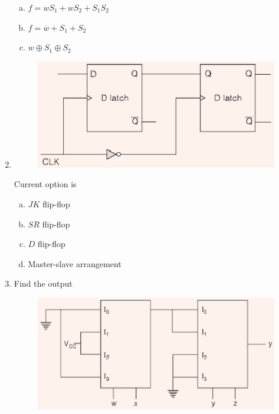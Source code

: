 \documentclass[journal,12pt,twocolumn]{IEEEtran}
\begin{document}
\begin{enumerate}
\begin{enumerate}[(a)]
\item $ f = w S_1 + w S_2 + S_1 S_2 $

\item $ f = \overline{w} + S_1 + S_2 $

\item $ w \oplus S_1 \oplus S_2 $

\end{enumerate}


\item

 \begin{figure}

\centering

\includegraphics[width=\columnwidth]{./figs/57.eps}

\caption{}

\label{fig:51}

\end{figure} 



Current option is 

\begin{enumerate}[(a)]

\item $JK$ flip-flop

\item $SR$ flip-flop

\item $D$ flip-flop

\item Master-slave arrangement

\end{enumerate}

\item Find the output

\begin{figure}

\centering

\includegraphics[width=\columnwidth]{./figs/58.eps}


\end{figure}
\end{enumerate}
\end{document}
